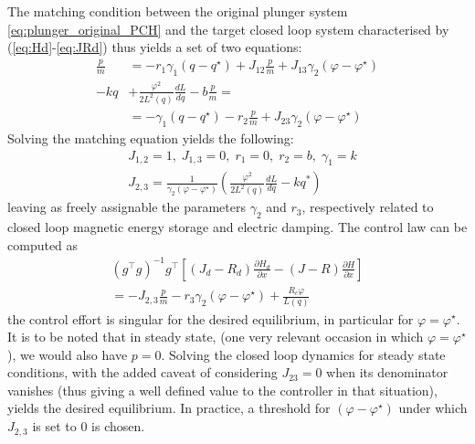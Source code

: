 \documentclass[letterpaper, 10pt, conference]{ieeeconf}
\begin{document}
The matching condition between the original plunger system \eqref{eq:plunger_original_PCH} and the target closed loop system characterised by (\ref{eq:Hd}-\ref{eq:JRd}) thus yields a set of two equations:
\begin{equation}
    \begin{aligned}
        \frac{p}{m} &= -r_{1} \gamma_{1}(q-q^\star) + J_{12} \frac{p}{m} + J_{13}\gamma_{2}(\varphi - \varphi^\star)     \\ 
        -kq  &+ \frac{\varphi^2}{2L^2(q)} \frac{dL}{dq} - b\frac{p}{m} = \\ &=-\gamma_{1}(q-q^\star) - r_{2} \frac{p}{m} + J_{23}\gamma_{2} (\varphi-\varphi^\star)
    \end{aligned}
\end{equation}
Solving the matching equation yields the following:
\begin{equation}
    \begin{aligned}
    &J_{1,2}=1, \; J_{1,3}=0, \; r_1=0, \; r_2=b, \; \gamma_1=k\\
    &J_{2,3}=\frac{1}{\gamma_{2}(\varphi-\varphi^\star)} \left(\frac{\varphi^2}{2L^2(q)} \frac{dL}{dq}-kq^*\right)
    \end{aligned}
\end{equation}
leaving as freely assignable the parameters $\gamma_2$ and $r_3$, respectively related to closed loop magnetic energy storage and electric damping. The control law can be computed as 
\begin{equation}
    \begin{multlined}
        (g^\top g)^{-1}g^\top \left[ (J_{d}-R_{d}) \frac{\partial H_{d}}{\partial x} - (J-R) \frac{\partial H}{\partial x} \right] \\
        = -J_{2,3} \frac{p}{m} -r_{3}\gamma_{2}(\varphi -\varphi^\star) + \frac{R_{c}\varphi}{L(q)}
    \end{multlined}
\end{equation}
the control effort is singular for the desired equilibrium, in particular for $\varphi = \varphi^\star$. It is to be noted that in steady state, (one very relevant occasion in which $\varphi=\varphi^\star$), we would also have $p=0$. Solving the closed loop dynamics for steady state conditions, with the added caveat of considering $J_{23}=0$ when its denominator vanishes (thus giving a well defined value to the controller in that situation), yields the desired equilibrium. In practice, a threshold for $(\varphi-\varphi^\star)$ under which $J_{2,3}$ is set to 0 is chosen.
\end{document}
